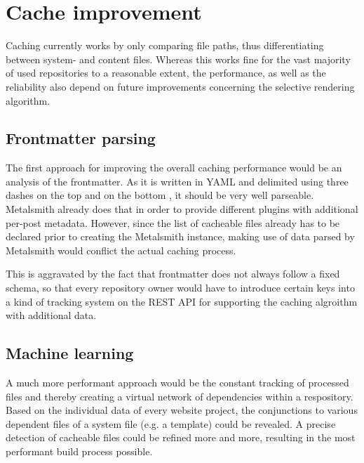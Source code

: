 \section{Cache improvement}
\label{sec:cacheimprovement}

Caching currently works by only comparing file paths, thus differentiating between system- and content files. Whereas this works fine for the vast majority of used repositories to a reasonable extent, the performance, as well as the reliability also depend on future improvements concerning the selective rendering algorithm.

\subsection{Frontmatter parsing}
The first approach for improving the overall caching performance would be an analysis of the frontmatter. As it is written in YAML and delimited using three dashes on the top and on the bottom \cite[77]{dhillon2016}, it should be very well parseable. Metalsmith already does that in order to provide different plugins with additional per-post metadata. However, since the list of cacheable files already has to be declared prior to creating the Metalsmith instance, making use of data parsed by Metalsmith would conflict the actual caching process.

This is aggravated by the fact that frontmatter does not always follow a fixed schema, so that every repository owner would have to introduce certain keys into a kind of tracking system on the REST API for supporting the caching algroithm with additional data.

\subsection{Machine learning}
\label{sec:chacheimprovement-machinelearning}
A much more performant approach would be the constant tracking of processed files and thereby creating a virtual network of dependencies within a respository. Based on the individual data of every website project, the conjunctions to various dependent files of a system file (e.g. a template) could be revealed. A precise detection of cacheable files could be refined more and more, resulting in the most performant build process possible.
